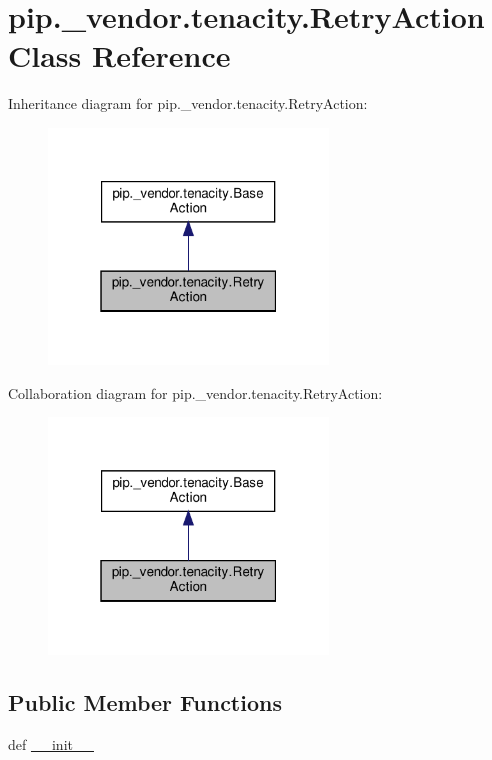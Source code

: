 \hypertarget{classpip_1_1__vendor_1_1tenacity_1_1RetryAction}{}\section{pip.\+\_\+vendor.\+tenacity.\+Retry\+Action Class Reference}
\label{classpip_1_1__vendor_1_1tenacity_1_1RetryAction}


Inheritance diagram for pip.\+\_\+vendor.\+tenacity.\+Retry\+Action\+:
\nopagebreak
\begin{figure}[H]
\begin{center}
\leavevmode
\includegraphics[width=211pt]{classpip_1_1__vendor_1_1tenacity_1_1RetryAction__inherit__graph}
\end{center}
\end{figure}


Collaboration diagram for pip.\+\_\+vendor.\+tenacity.\+Retry\+Action\+:
\nopagebreak
\begin{figure}[H]
\begin{center}
\leavevmode
\includegraphics[width=211pt]{classpip_1_1__vendor_1_1tenacity_1_1RetryAction__coll__graph}
\end{center}
\end{figure}
\subsection*{Public Member Functions}
\begin{DoxyCompactItemize}
\item 
def \hyperlink{classpip_1_1__vendor_1_1tenacity_1_1RetryAction_a5e34a00038c80638638009a338f4d78d}{\+\_\+\+\_\+init\+\_\+\+\_\+}
\end{DoxyCompactItemize}
